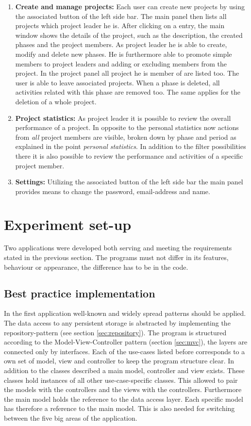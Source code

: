 \begin{enumerate}
\item \textbf{Create and manage projects:} Each user can create new projects by using the associated button of the left side bar. The main panel then lists all projects which project leader he is. After clicking on a entry, the main window shows the details of the project, such as the description, the created phases and the project members. As project leader he is able to create, modify and delete new phases. He is furthermore able to promote simple members to project leaders and adding or excluding members from the project. In the project panel all project he is member of are listed too. The user is able to leave associated projects. When a phase is deleted, all activities related with this phase are removed too. The same applies for the deletion of a whole project. 

\item \textbf{Project statistics:} As project leader it is possible to review the overall performance of a project. In opposite to the personal statistics now actions from \emph{all} project members are visible, broken down by phase and period as explained in the point \emph{personal statistics}. In addition to the filter possibilities there it is also possible to review the performance and activities of a specific project member.

\item \textbf{Settings:} Utilizing the associated button of the left side bar the main panel provides means to change the password, email-address and name.
\end{enumerate}

\section{Experiment set-up}
Two applications were developed both serving and meeting the requirements stated in the previous section. The programs must not differ in its features, behaviour or appearance, the difference has to be in the code. 
\subsection{Best practice implementation}
In the first application well-known and widely spread patterns should be applied. The data access to any persistent storage is abstracted by implementing the repository-pattern (see section \ref{sec:repository}). The program is structured according to the Model-View-Controller pattern (section \ref{sec:mvc}), the layers are connected only by interfaces. Each of the use-cases listed before corresponds to a own set of model, view and controller to keep the program structure clear. In addition to the classes described a main model, controller and view exists. These classes hold instances of all other use-case-specific classes. This allowed to pair the models with the controllers and the views with the controllers. Furthermore the main model holds the reference to the data access layer. Each specific model has therefore a reference to the main model. This is also needed for switching between the five big areas of the application.

